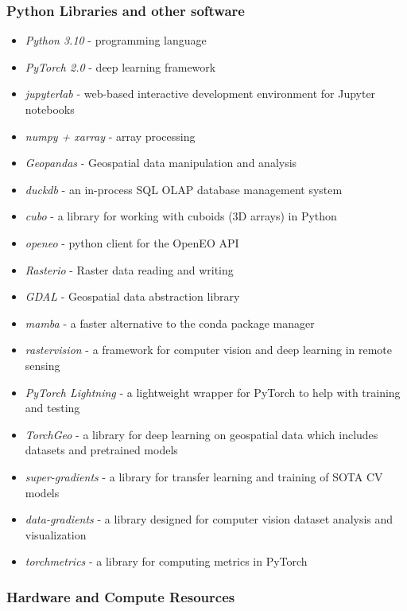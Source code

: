 \begin{multicols}{2}
\subsubsection{Python Libraries and other software}
\begin{itemize}
    \item \textit{Python 3.10} - programming language  
    \item \textit{PyTorch 2.0} - deep learning framework  
    \item \textit{jupyterlab} - web-based interactive development environment for Jupyter notebooks
    \item \textit{numpy + xarray} - array processing
    \item \textit{Geopandas} - Geospatial data manipulation and analysis
    \item \textit{duckdb} - an in-process SQL OLAP database management system
    \item \textit{cubo} - a library for working with cuboids (3D arrays) in Python
    \item \textit{openeo} - python client for the OpenEO API
    \item \textit{Rasterio} - Raster data reading and writing
    \item \textit{GDAL} - Geospatial data abstraction library
    \item \textit{mamba} - a faster alternative to the conda package manager
    \item \textit{rastervision} - a framework for computer vision and deep learning in remote sensing
    \item \textit{PyTorch Lightning} - a lightweight wrapper for PyTorch to help with training and testing
    \item \textit{TorchGeo} - a library for deep learning on geospatial data which includes datasets and pretrained models
    \item \textit{super-gradients} - a library for transfer learning and training of SOTA CV models
    \item \textit{data-gradients} - a library designed for computer vision dataset analysis and visualization
    \item \textit{torchmetrics} - a library for computing metrics in PyTorch
\end{itemize}

\subsubsection{Hardware and Compute Resources}

\end{multicols}

